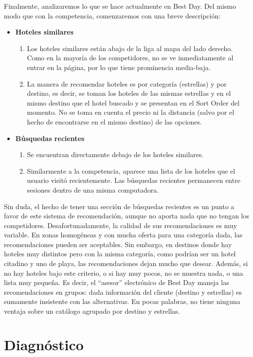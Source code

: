 \documentclass[12pt]{report}
\begin{document}
Finalmente, analizaremos lo que se hace actualmente en Best Day. Del mismo modo que con la competencia, comenzaremos con una breve descripción:
\begin{itemize}
	\item \textbf{Hoteles similares}
	\begin{enumerate}
		\item Los hoteles similares están abajo de la liga al mapa del lado derecho. Como en la mayoría de los competidores, no se ve inmediatamente al entrar en la página, por lo que tiene prominencia media-baja.
		\item La manera de recomendar hoteles es por categoría (estrellas) y por destino, es decir, se toman los hoteles de las mismas estrellas y en el mismo destino que el hotel buscado y se presentan en el Sort Order del momento. No se toma en cuenta el precio ni la distancia (salvo por el hecho de encontrarse en el mismo destino) de las opciones.
	\end{enumerate}
	\item \textbf{Búsquedas recientes}
	\begin{enumerate}
		\item Se encuentran directamente debajo de los hoteles similares.
		\item Similarmente a la competencia, aparece una lista de los hoteles que el usuario visitó recientemente. Las búsquedas recientes permanecen entre sesiones dentro de una misma computadora.
	\end{enumerate}
\end{itemize}
Sin duda, el hecho de tener una sección de búsquedas recientes es un punto a favor de este sistema de recomendación, aunque no aporta nada que no tengan los competidores. Desafortunadamente, la calidad de sus recomendaciones es muy variable. En zonas homogéneas y con mucha oferta para una categoría dada, las recomendaciones pueden ser aceptables. Sin embargo, en destinos donde hay hoteles muy distintos pero con la misma categoría, como podrían ser un hotel citadino y uno de playa, las recomendaciones dejan mucho que desear. Además, si no hay hoteles bajo este criterio, o si hay muy pocos, no se muestra nada, o una lista muy pequeña. Es decir, el ``asesor'' electrónico de Best Day maneja las recomendaciones en grupos: dada información del cliente (destino y estrellas) es sumamente insistente con las alternativas. En pocas palabras, no tiene ninguna ventaja sobre un catálogo agrupado por destino y estrellas.

\section{Diagnóstico}
\end{document}
